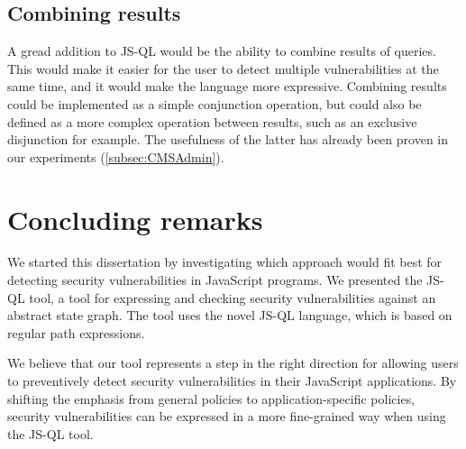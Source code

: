 \subsection*{Combining results}

A gread addition to JS-QL would be the ability to combine results of queries. This would make it easier for the user to detect multiple vulnerabilities at the same time, and it would make the language more expressive. Combining results could be implemented as a simple conjunction operation, but could also be defined as a more complex operation between results, such as an exclusive disjunction for example. The usefulness of the latter has already been proven in our experiments (\ref{subsec:CMSAdmin}).

\section{Concluding remarks}
We started this dissertation by investigating which approach would fit best for detecting security vulnerabilities in JavaScript programs. We presented the JS-QL tool, a tool for expressing and checking security vulnerabilities against an abstract state graph. The tool uses the novel JS-QL language, which is based on regular path expressions. 

We believe that our tool represents a step in the right direction for allowing users to preventively detect security vulnerabilities in their JavaScript applications. By shifting the emphasis from general policies to application-specific policies, security vulnerabilities can be expressed in a more fine-grained way when using the JS-QL tool. 
